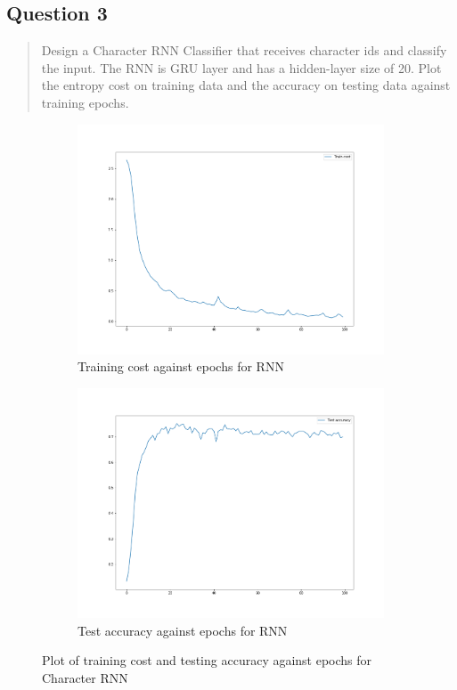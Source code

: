 \subsection{Question 3}
\label{2q3}
\begin{quote}
Design a Character RNN Classifier that receives character ids and classify the input. The RNN is GRU layer and has a hidden-layer size of 20. Plot the entropy cost on training data and the accuracy on testing data against training epochs.
\end{quote}

\begin{figure}[H]
    \begin{subfigure}{0.5\textwidth}
        \centering
        \includegraphics[width=1\linewidth]{assets/plots2/q3_1.png}
        \caption{Training cost against epochs for RNN}
        \label{fig:1a_cost}
    \end{subfigure}
    \begin{subfigure}{0.5\textwidth}
        \centering
        \includegraphics[width=1\linewidth]{assets/plots2/q3_2.png}
        \caption{Test accuracy against epochs for RNN}
        \label{fig:1a_cost}
    \end{subfigure}
    \caption{Plot of training cost and testing accuracy against epochs for Character RNN}
    \label{fig:1a}
\end{figure}


